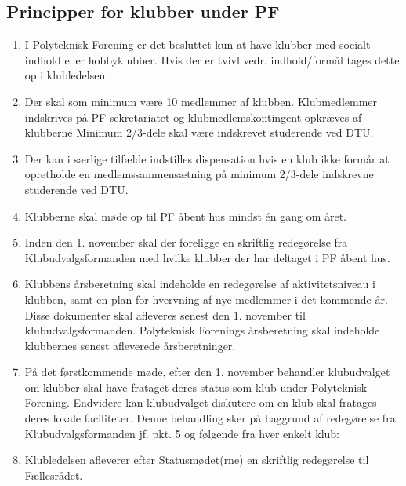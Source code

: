 \subsection{Principper for klubber under PF}
\begin{enumerate}
\item I Polyteknisk Forening er det besluttet kun at have klubber med socialt indhold eller hobbyklubber. Hvis der er
tvivl vedr. indhold/formål tages dette op i klubledelsen.
\item Der skal som minimum være 10 medlemmer af klubben. Klubmedlemmer indskrives på PF-sekretariatet og
klubmedlemskontingent opkræves af klubberne Minimum 2/3-dele skal være indskrevet studerende ved DTU.
\item Der kan i særlige tilfælde indstilles dispensation hvis en klub ikke formår at opretholde en
medlemssammensætning på minimum 2/3-dele indskrevne studerende ved DTU.
\item Klubberne skal møde op til PF åbent hus mindst én gang om året.
\item Inden den 1. november skal der foreligge en skriftlig redegørelse fra Klubudvalgsformanden med hvilke
klubber der har deltaget i PF åbent hus.
\item Klubbens årsberetning skal indeholde en redegørelse af aktivitetsniveau i klubben, samt en plan for hvervning
af nye medlemmer i det kommende år. Disse dokumenter skal afleveres senest den 1. november til
klubudvalgsformanden. Polyteknisk Forenings årsberetning skal indeholde klubbernes senest afleverede
årsberetninger.
\item På det førstkommende møde, efter den 1. november behandler klubudvalget om klubber skal have frataget deres status som klub under Polyteknisk Forening. Endvidere kan klubudvalget diskutere om en klub skal fratages deres lokale faciliteter. Denne behandling sker på baggrund af redegørelse fra Klubudvalgsformanden jf. pkt. 5 og følgende fra hver enkelt klub:
\item Klubledelsen afleverer efter Statusmødet(rne) en skriftlig redegørelse til Fællesrådet.
\end{enumerate}

